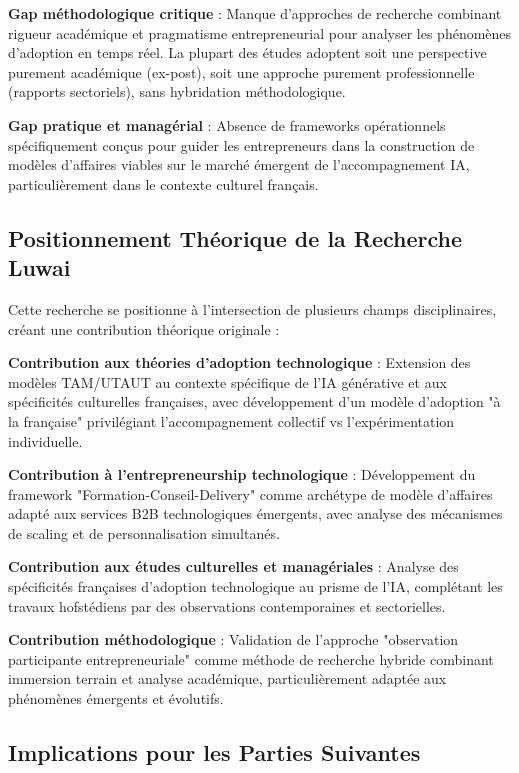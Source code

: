 \textbf{Gap méthodologique critique} : Manque d'approches de recherche combinant rigueur académique et pragmatisme entrepreneurial pour analyser les phénomènes d'adoption en temps réel. La plupart des études adoptent soit une perspective purement académique (ex-post), soit une approche purement professionnelle (rapports sectoriels), sans hybridation méthodologique.

\textbf{Gap pratique et managérial} : Absence de frameworks opérationnels spécifiquement conçus pour guider les entrepreneurs dans la construction de modèles d'affaires viables sur le marché émergent de l'accompagnement IA, particulièrement dans le contexte culturel français.

\subsection{Positionnement Théorique de la Recherche Luwai}

Cette recherche se positionne à l'intersection de plusieurs champs disciplinaires, créant une contribution théorique originale :

\textbf{Contribution aux théories d'adoption technologique} : Extension des modèles TAM/UTAUT au contexte spécifique de l'IA générative et aux spécificités culturelles françaises, avec développement d'un modèle d'adoption "à la française" privilégiant l'accompagnement collectif vs l'expérimentation individuelle.

\textbf{Contribution à l'entrepreneurship technologique} : Développement du framework "Formation-Conseil-Delivery" comme archétype de modèle d'affaires adapté aux services B2B technologiques émergents, avec analyse des mécanismes de scaling et de personnalisation simultanés.

\textbf{Contribution aux études culturelles et managériales} : Analyse des spécificités françaises d'adoption technologique au prisme de l'IA, complétant les travaux hofstédiens par des observations contemporaines et sectorielles.

\textbf{Contribution méthodologique} : Validation de l'approche "observation participante entrepreneuriale" comme méthode de recherche hybride combinant immersion terrain et analyse académique, particulièrement adaptée aux phénomènes émergents et évolutifs.

\subsection{Implications pour les Parties Suivantes}

